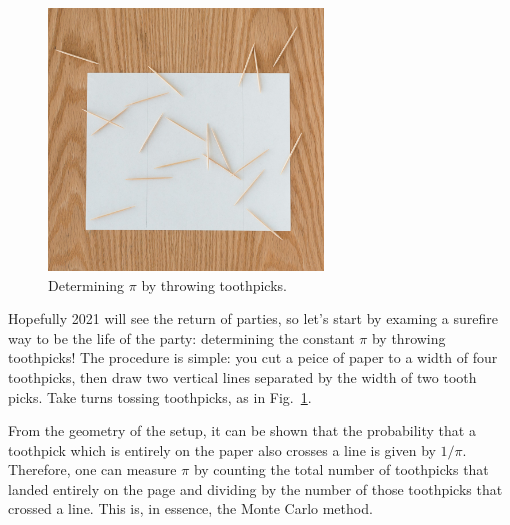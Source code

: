 \begin{figure}[htbp]
\begin{center}
\includegraphics[width=0.65\textwidth]{figs/monte_carlo/pitoss.jpg} 
\caption{Determining $\pi$ by throwing toothpicks.}
\label{fig:pitoss}
\end{center}
\end{figure}

\noindent
Hopefully 2021 will see the return of parties, so let's start by
examing a surefire way to be the life of the party: determining the
constant $\pi$ by throwing toothpicks!  The procedure is simple: you
cut a peice of paper to a width of four toothpicks, then draw two
vertical lines separated by the width of two tooth picks.  Take turns
tossing toothpicks, as in Fig.~\ref{fig:pitoss}.

From the geometry of the setup, it can be shown that the probability
that a toothpick which is entirely on the paper also crosses a line is
given by $1/\pi$.  Therefore, one can measure $\pi$ by counting the
total number of toothpicks that landed entirely on the page and
dividing by the number of those toothpicks that crossed a line.  This
is, in essence, the Monte Carlo method.

